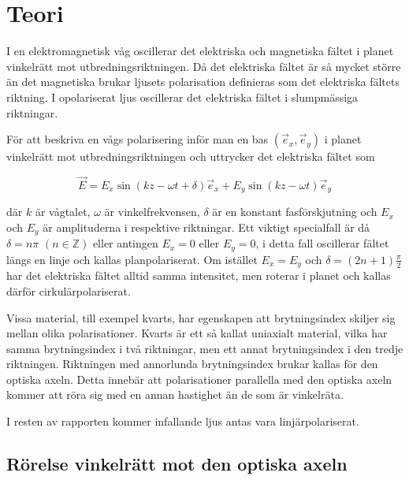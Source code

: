 \documentclass[a4paper]{article}
\begin{document}
\section{Teori}

I en elektromagnetisk våg oscillerar det elektriska och magnetiska fältet i planet vinkelrätt mot utbredningsriktningen. Då det elektriska fältet är så mycket större än det magnetiska brukar ljusets polarisation definieras som det elektriska fältets riktning. I opolariserat ljus oscillerar det elektriska fältet i slumpmässiga riktningar. \cite[pp.~146--148]{pearsonIntroOpt}

För att beskriva en vågs polarisering inför man en bas $(\vec e_x, \vec e_y)$ i planet vinkelrätt mot utbredningsriktningen och uttrycker det elektriska fältet som \cite{labManual}

\begin{equation}
	\vec E = E_x \sin\left(k z - \omega t + \delta\right) \vec e_x + E_y \sin\left(k z - \omega t\right) \vec e_y
\end{equation}

där $k$ är vågtalet, $\omega$ är vinkelfrekvensen, $\delta$ är en konstant fasförskjutning och $E_x$ och $E_y$ är amplituderna i respektive riktningar. Ett viktigt specialfall är då $\delta = n\pi \,\, \left(n \in \mathbb{Z}\right)$ eller antingen $E_x=0$ eller $E_y=0$, i detta fall oscillerar fältet längs en linje och kallas planpolariserat. Om istället $E_x=E_y$ och $\delta = \left(2 n + 1\right)\frac{\pi}{2}$ har det elektriska fältet alltid samma intensitet, men roterar i planet och kallas därför cirkulärpolariserat. \cite{labManual}\cite[p.~147]{pearsonIntroOpt}

Vissa material, till exempel kvarts, har egenskapen att brytningsindex skiljer sig mellan olika polarisationer. Kvarts är ett så kallat uniaxialt material, vilka har samma brytningsindex i två riktningar, men ett annat brytningsindex i den tredje riktningen. Riktningen med annorlunda brytningsindex brukar kallas för den optiska axeln. Detta innebär att polarisationer parallella med den optiska axeln kommer att röra sig med en annan hastighet än de som är vinkelräta.\cite{labManual}\cite[pp.~382--383]{pearsonIntroOpt}

I resten av rapporten kommer infallande ljus antas vara linjärpolariserat.

\subsection{Rörelse vinkelrätt mot den optiska axeln}
\end{document}
